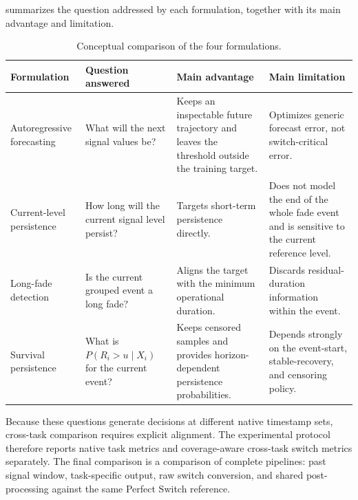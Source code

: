  summarizes the question addressed by each
formulation, together with its main advantage and limitation.

\begin{table}[htbp]
  \centering
  \small
  \caption{Conceptual comparison of the four formulations.}
  \label{tab:formulation-comparison}
  \renewcommand{\arraystretch}{1.25}
  \setlength{\tabcolsep}{3pt}
  \begin{tabular}{@{}>{\raggedright\arraybackslash}p{}
    >{\raggedright\arraybackslash}p{}
    >{\raggedright\arraybackslash}p{}
    >{\raggedright\arraybackslash}p{}@{}}
    \toprule
    Formulation & Question answered & Main advantage & Main limitation \\
    \midrule
    Autoregressive forecasting
      & What will the next signal values be?
      & Keeps an inspectable future trajectory and leaves the threshold outside
        the training target.
      & Optimizes generic forecast error, not switch-critical error. \\
    Current-level persistence
      & How long will the current signal level persist?
      & Targets short-term persistence directly.
      & Does not model the end of the whole fade event and is sensitive to the
        current reference level. \\
    Long-fade detection
      & Is the current grouped event a long fade?
      & Aligns the target with the minimum operational duration.
      & Discards residual-duration information within the event. \\
    Survival persistence
      & What is \(P(R_i>u\mid X_i)\) for the current event?
      & Keeps censored samples and provides horizon-dependent persistence
        probabilities.
      & Depends strongly on the event-start, stable-recovery, and censoring
        policy. \\
    \bottomrule
  \end{tabular}
\end{table}

Because these questions generate decisions at different native timestamp sets,
cross-task comparison requires explicit alignment. The experimental protocol
therefore reports native task metrics and coverage-aware cross-task switch
metrics separately. The final comparison is a comparison of complete pipelines:
past signal window, task-specific output, raw switch conversion, and shared
post-processing against the same Perfect Switch reference.
